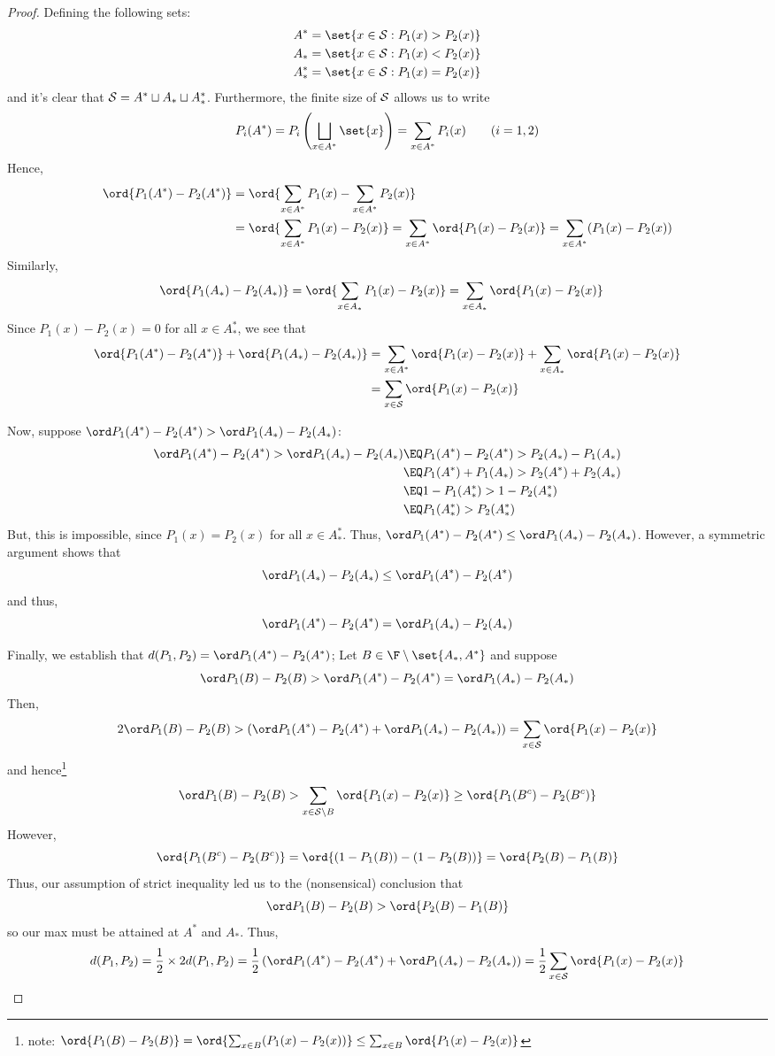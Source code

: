 \documentclass[12pt,titlepage]{article}
\begin{document}
\begin{proof} Defining the following sets:
\begin{align*}
A^{*} &= \set{ x \in \S : P_1(x) > P_2(x) } \\
A_{*} &= \set{ x \in \S : P_1(x) < P_2(x) } \\
A_{*}^{*} &= \set{ x \in \S : P_1(x) = P_2(x)}
\end{align*}
and it's clear that $\S = A^{*} \sqcup A_{*} \sqcup A_{*}^{*}$.  Furthermore, the finite size of $\S$ allows us to write 
\[
P_i(A^{*}) = P_{i}\left( \bigsqcup_{x \in A^{*}} \set{x} \right) = \sum_{x \in A^{*}} P_{i}(x) \qquad (i=1,2)
\]
Hence,
\begin{align*}
\ord{P_{1}(A^{*}) - P_{2}(A^{*})} &= \ord{ \sum_{x\in A^{*}} P_1(x) - \sum_{x \in A^{*}} P_{2}(x)} \\
&= \ord{ \sum_{x \in A^{*}} P_1(x) - P_2(x) } = \sum_{x \in A^{*}} \ord{P_1(x) - P_2(x)} = \sum_{x \in A^{*}} (P_1(x) - P_2(x))
\end{align*}
Similarly, 
\begin{align*}
\ord{P_1(A_{*}) - P_{2}(A_{*})} &= \ord{\sum_{x \in A_{*}} P_{1}(x) - P_{2}(x)} = \sum_{x \in A_{*}} \ord{P_{1}(x) - P_{2}(x)}
\end{align*}
Since $P_{1}(x) - P_{2}(x) = 0$ for all $x \in A_{*}^{*}$, we see that
\begin{align*}
\ord{P_1(A^{*}) - P_{2}(A^{*})}+\ord{P_1(A_{*}) - P_{2}(A_{*})} &= \sum_{x\in A^{*}}\ord{ P_1(x) - P_2(x)} + \sum_{x \in A_{*}} \ord{P_{1}(x) - P_{2}(x)} \\
&= \sum_{x \in \S} \ord{P_{1}(x) - P_{2}(x)}
\end{align*}

Now, suppose $\g > \G$:
\begin{align*}
\g > \G &\EQ P_1(A^*) - P_2(A^*) > P_{2}(A_*) - P_{1}(A_*) \\
&\EQ P_1(A^*) + P_{1}(A_*) > P_2(A^*) + P_2(A_*) \\
&\EQ 1 - P_1(A_{*}^{*}) > 1 - P_2(A_{*}^{*}) \\
&\EQ P_1(A_{*}^{*}) > P_2(A_{*}^{*})
\end{align*}
But, this is impossible, since $P_{1}(x) = P_{2}(x)$ for all $x \in A_{*}^{*}$. Thus, $\g \leq \G$. However, a symmetric argument shows that \[\G \leq \g\] and thus, 
\[
\g = \G
\]

Finally, we establish that $\dist = \g$; Let $B \in \F \setminus\set{A_{*},A^{*}}$ and suppose
\[
\h > \g = \G
\]
Then, 
\[
2 \h > \left(\g + \G\right) = \sum_{x\in\S}\ord{P_{1}(x) - P_{2}(x)}
\]
and hence\footnote{note: $\ord{P_1(B) - P_2(B)} = \ord{\sum_{x\in B}(P_1(x)-P_2(x))} \leq \sum_{x \in B}\ord{P_1(x) -P_2(x)}$}
\[
\h > \sum_{x \in \S\setminus B}\ord{P_{1}(x) - P_{2}(x)} \geq \ord{P_{1}(B^{c}) - P_{2}(B^{c})}
\]
However, 
\[
\ord{P_{1}(B^{c}) - P_{2}(B^{c})} = \ord{(1-P_{1}(B)) - (1-P_{2}(B))} = \ord{P_2(B) - P_1(B)}
\]
Thus, our assumption of strict inequality led us to the (nonsensical) conclusion that
\[
\h > \ord{P_2(B) - P_1(B)}
\]
so our max must be attained at $A^{*}$ and $A_{*}$. Thus, 
\[
\dist = \frac{1}{2} \times 2\dist = \frac{1}{2}\left(\g + \G \right) = \frac{1}{2} \sum_{x\in\S}\ord{P_{1}(x) - P_{2}(x)}
\]
\end{proof}
\end{document}
